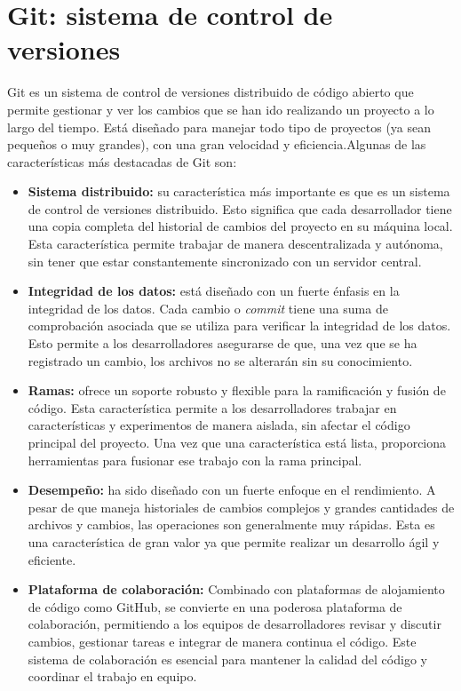     \section{Git: sistema de control de versiones}
    Git \cite{wiki:git} es un sistema de control de versiones distribuido de código abierto que permite gestionar y ver los cambios que se han ido realizando un proyecto a lo largo del tiempo. Está diseñado para manejar todo tipo de proyectos (ya sean pequeños o muy grandes), con una gran velocidad y eficiencia.Algunas de las características más destacadas de Git son:
    \begin{itemize}
        \item \textbf{Sistema distribuido:} su característica más importante es que es un sistema de control de versiones distribuido. Esto significa que cada desarrollador tiene una copia completa del historial de cambios del proyecto en su máquina local. Esta característica permite trabajar de manera descentralizada y autónoma, sin tener que estar constantemente sincronizado con un servidor central.
        \item \textbf{Integridad de los datos:} está diseñado con un fuerte énfasis en la integridad de los datos. Cada cambio o \textit{commit} tiene una suma de comprobación asociada que se utiliza para verificar la integridad de los datos. Esto permite a los desarrolladores asegurarse de que, una vez que se ha registrado un cambio, los archivos no se alterarán sin su conocimiento.
        \item \textbf{Ramas:} ofrece un soporte robusto y flexible para la ramificación y fusión de código. Esta característica permite a los desarrolladores trabajar en características y experimentos de manera aislada, sin afectar el código principal del proyecto. Una vez que una característica está lista, proporciona herramientas para fusionar ese trabajo con la rama principal.
        \item \textbf{Desempeño:} ha sido diseñado con un fuerte enfoque en el rendimiento. A pesar de que maneja historiales de cambios complejos y grandes cantidades de archivos y cambios, las operaciones son generalmente muy rápidas. Esta es una característica de gran valor ya que permite realizar un desarrollo ágil y eficiente.
        \item \textbf{Plataforma de colaboración:} Combinado con plataformas de alojamiento de código como GitHub, se convierte en una poderosa plataforma de colaboración, permitiendo a los equipos de desarrolladores revisar y discutir cambios, gestionar tareas e integrar de manera continua el código. Este sistema de colaboración es esencial para mantener la calidad del código y coordinar el trabajo en equipo.
    \end{itemize}
        
